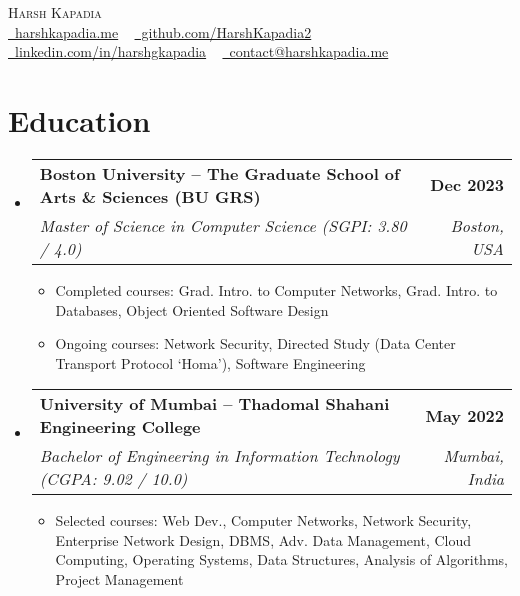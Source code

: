 \documentclass[letterpaper,11pt]{article}
\makeatletter
\newcommand{\resumeItem}[1]{
  \item\small{
    {#1 \vspace{-2pt}}
  }
}
\newcommand{\resumeSubheading}[4]{
  \vspace{-2pt}\item
    \begin{tabular*}{1.0\textwidth}[t]{l@{\extracolsep{\fill}}r}
      \vspace{-2pt}\textbf{#1} & \textbf{\small #2} \\
      \textit{\small#3} & \textit{\small #4} \\
    \end{tabular*}\vspace{-7pt}
}
\newcommand{\resumeSubHeadingListStart}{\begin{itemize}[leftmargin=0.0in, label={}]}
\newcommand{\resumeSubHeadingListEnd}{\end{itemize}}
\newcommand{\resumeItemListStart}{\begin{itemize}}
\newcommand{\resumeItemListEnd}{\end{itemize}\vspace{-5pt}}
\makeatother
\begin{document}

\begin{center}
    {\huge \scshape Harsh Kapadia} \\ \vspace{1pt}
    \small
    \faGlobe \href{https://harshkapadia.me}{\raisebox{-0.1\height}\ harshkapadia.me} ~
    \faGithub \href{https://github.com/HarshKapadia2}{\raisebox{-0.2\height}\ github.com/HarshKapadia2} ~
    \faLinkedin \href{https://linkedin.com/in/harshgkapadia}{\raisebox{-0.2\height}\ linkedin.com/in/harshgkapadia} ~
    \faEnvelope \href{mailto:contact@harshkapadia.me}{\raisebox{-0.2\height}\  contact@harshkapadia.me}
    \vspace{-13pt}
\end{center}


\section{Education}
    \vspace{-2pt}
    \resumeSubHeadingListStart
        \resumeSubheading
            {Boston University -- The Graduate School of Arts \& Sciences (BU GRS)}{Dec 2023}
            {Master of Science in Computer Science (SGPI: 3.80 / 4.0)}{Boston, USA}
            \resumeItemListStart
                \resumeItem{Completed courses: Grad. Intro. to Computer Networks, Grad. Intro. to Databases, Object Oriented Software Design}
                \resumeItem{Ongoing courses: Network Security, Directed Study (Data Center Transport Protocol `Homa'), Software Engineering}
            \resumeItemListEnd
        \vspace{-3pt}

        \resumeSubheading
            {University of Mumbai -- Thadomal Shahani Engineering College}{May 2022}
            {Bachelor of Engineering in Information Technology (CGPA: 9.02 / 10.0)}{Mumbai, India}
            \resumeItemListStart
                \resumeItem{Selected courses: Web Dev., Computer Networks, Network Security, Enterprise Network Design, DBMS, Adv. Data Management, Cloud Computing, Operating Systems, Data Structures, Analysis of Algorithms, Project Management}
            \resumeItemListEnd
    \resumeSubHeadingListEnd
\vspace{-19pt}
\end{document}
